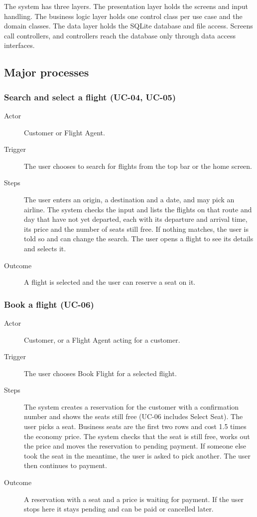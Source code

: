The system has three layers. The presentation layer holds the screens and input
handling. The business logic layer holds one control class per use case and the
domain classes. The data layer holds the SQLite database and file access.
Screens call controllers, and controllers reach the database only through data
access interfaces.

\subsection*{Major processes}

\subsubsection*{Search and select a flight (UC-04, UC-05)}

\begin{description}
\item[Actor] Customer or Flight Agent.
\item[Trigger] The user chooses to search for flights from the top bar or the home screen.
\item[Steps] The user enters an origin, a destination and a date, and may pick
  an airline. The system checks the input and lists the flights on that route
  and day that have not yet departed, each with its departure and arrival
  time, its price and the number of seats still free. If nothing matches, the
  user is told so and can change the search. The user opens a flight to see its
  details and selects it.
\item[Outcome] A flight is selected and the user can reserve a seat on it.
\end{description}

\subsubsection*{Book a flight (UC-06)}

\begin{description}
\item[Actor] Customer, or a Flight Agent acting for a customer.
\item[Trigger] The user chooses Book Flight for a selected flight.
\item[Steps] The system creates a reservation for the customer with a
  confirmation number and shows the seats still free (UC-06 includes Select
  Seat). The user picks a seat. Business seats are the first two rows and cost
  1.5 times the economy price. The system checks that the seat is still free,
  works out the price and moves the reservation to pending payment. If someone
  else took the seat in the meantime, the user is asked to pick another. The
  user then continues to payment.
\item[Outcome] A reservation with a seat and a price is waiting for payment.
  If the user stops here it stays pending and can be paid or cancelled later.
\end{description}

